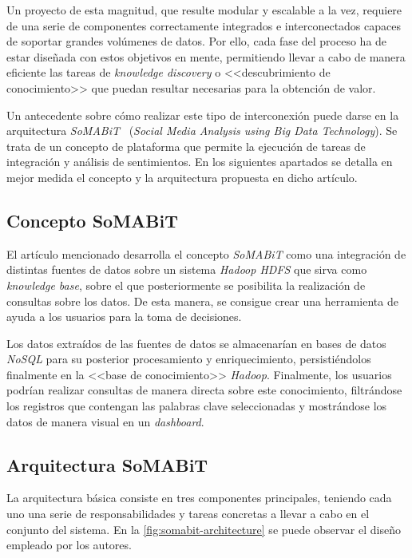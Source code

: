 Un proyecto de esta magnitud,  que resulte modular y escalable a la vez, requiere de una serie de componentes correctamente integrados e interconectados capaces de soportar grandes volúmenes de datos. Por ello, cada fase del proceso ha de estar diseñada con estos objetivos en mente, permitiendo llevar a cabo de manera eficiente las tareas de \textit{knowledge discovery} o <<descubrimiento de conocimiento>> que puedan resultar necesarias para la obtención de valor.

Un antecedente sobre cómo realizar este tipo de interconexión puede darse en la arquitectura \textit{SoMABiT}~\cite{bohlouli2020knowledge} (\textit{Social Media Analysis using Big Data Technology}). Se trata de un concepto de plataforma que permite la ejecución de tareas de integración y análisis de sentimientos. En los siguientes apartados se detalla en mejor medida el concepto y la arquitectura propuesta en dicho artículo.

\subsection{Concepto SoMABiT}

El artículo mencionado desarrolla el concepto \textit{SoMABiT} como una integración de distintas fuentes de datos sobre un sistema \textit{Hadoop HDFS} que sirva como \textit{knowledge base}, sobre el que posteriormente se posibilita la realización de consultas sobre los datos. De esta manera, se consigue crear una herramienta de ayuda a los usuarios para la toma de decisiones.

Los datos extraídos de las fuentes de datos se almacenarían en bases de datos \textit{NoSQL} para su posterior procesamiento y enriquecimiento, persistiéndolos finalmente en la <<base de conocimiento>> \textit{Hadoop}. Finalmente, los usuarios podrían realizar consultas de manera directa sobre este conocimiento, filtrándose los registros que contengan las palabras clave seleccionadas y mostrándose los datos de manera visual en un \textit{dashboard}.

\subsection{Arquitectura SoMABiT}

La arquitectura básica consiste en tres componentes principales, teniendo cada uno una serie de responsabilidades y tareas concretas a llevar a cabo en el conjunto del sistema. En la \autoref{fig:somabit-architecture} se puede observar el diseño empleado por los autores.


